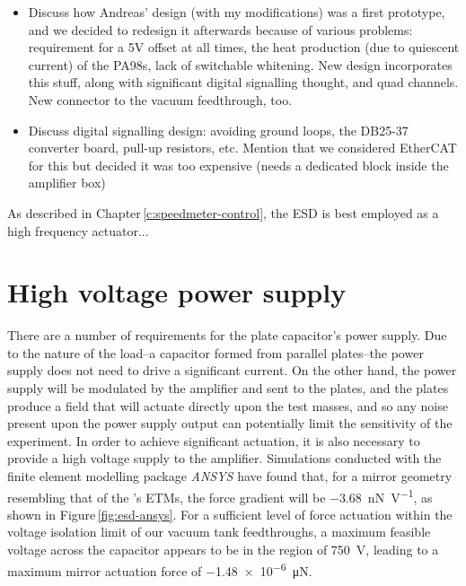 \begin{itemize}
  \item Discuss how Andreas' design (with my modifications) was a first prototype, and we decided to redesign it afterwards because of various problems: requirement for a 5V offset at all times, the heat production (due to quiescent current) of the PA98s, lack of switchable whitening. New design incorporates this stuff, along with significant digital signalling thought, and quad channels. New connector to the vacuum feedthrough, too.
  \item Discuss digital signalling design: avoiding ground loops, the DB25-37 converter board, pull-up resistors, etc. Mention that we considered EtherCAT for this but decided it was too expensive (needs a dedicated block inside the amplifier box)
\end{itemize}

As described in Chapter\,\ref{c:speedmeter-control}, the \gls{ESD} is best employed as a high frequency actuator...

\section{High voltage power supply}

\newcommand{\ESDFORCEGRAD}{\SI{-3.68}{\nano\newton\per\volt}}

\newcommand{\ESDMAXVOLTAGE}{\SI{750}{\volt}}

\newcommand{\ESDMAXFORCE}{\SI{-1.48e-6}{\micro\newton}}

There are a number of requirements for the plate capacitor's power supply. Due to the nature of the load--a capacitor formed from parallel plates--the power supply does not need to drive a significant current. On the other hand, the power supply will be modulated by the amplifier and sent to the plates, and the plates produce a field that will actuate directly upon the test masses, and so any noise present upon the power supply output can potentially limit the sensitivity of the experiment. In order to achieve significant actuation, it is also necessary to provide a high voltage supply to the amplifier. Simulations conducted with the finite element modelling package \emph{ANSYS} have found that, for a mirror geometry resembling that of the \SSMEXPT{}'s ETMs, the force gradient will be \ESDFORCEGRAD{}, as shown in Figure\,\ref{fig:esd-ansys}. For a sufficient level of force actuation within the voltage isolation limit of our vacuum tank feedthroughs, a maximum feasible voltage across the capacitor appears to be in the region of \ESDMAXVOLTAGE{}, leading to a maximum mirror actuation force of \ESDMAXFORCE{}.

